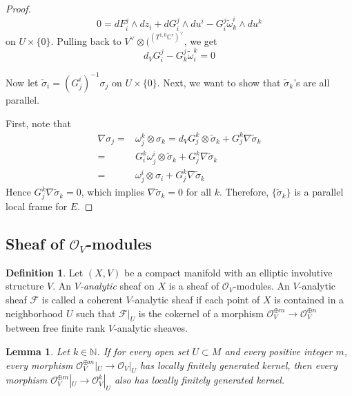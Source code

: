 \documentclass[12pt]{amsart}
\newtheorem{lem}[thm]{Lemma}
\theoremstyle{definition}
\newtheorem{defn}[thm]{Definition}
\theoremstyle{remark}
\numberwithin{equation}{section}
\newcommand{\CF}{{\mathcal F}}
\newcommand{\CO}{{\mathcal O}}
\newcommand{\C}{{\mathbb{C}}}
\newcommand{\N}{{\mathbb{N}}}
\newcommand{\1}{{\mathbb{1}}}
\begin{document}
\begin{proof}
 \begin{equation*}
     0 = dF^j_i\wedge dz_i + dG^j_i \wedge du^i - G^j_i \tilde{\omega}^i_k \wedge du^k
 \end{equation*}
 on $U \times \{0\}$. Pulling back to $V^{\vee}\otimes (^
 (T^{1,0}\C^r)^{\vee}$, we get   \begin{equation*}
     d_VG^j_i  - G^j_k \tilde{\omega}^k_i = 0
 \end{equation*}
 
 Now let $\tilde{\sigma}_i =(G^i_j)^{-1} \sigma_j$ on $U\times \{0\}$. Next, we want to show that $\tilde{\sigma}_k$'s are all parallel.
 
 First, note that
 \begin{align*}
     \nabla\sigma_j =& \omega^k_j \otimes \sigma_k = d_VG^k_j \otimes \tilde{\sigma}_k + G^k_j \nabla \tilde{\sigma}_k\\
     =&G^k_i\omega^i_j \otimes \tilde{\sigma}_k + G^k_j \nabla \tilde{\sigma}_k\\
     =&\omega^i_j \otimes {\sigma}_i + G^k_j \nabla \tilde{\sigma}_k
 \end{align*}
 Hence $ G^k_j \nabla \tilde{\sigma}_k = 0$, which implies $ \nabla \tilde{\sigma}_k = 0$ for all $k$. Therefore, $\{\tilde{\sigma}_k\}$ is a parallel local frame for $E$.
 \end{proof}
 
\subsection{Sheaf of $\CO_V$-modules}
\begin{defn}
    Let $(X, V)$ be a compact manifold with an elliptic involutive structure $V$. An {\it $V$-analytic} sheaf on $X$ is a sheaf of $\CO_V$-modules. An $V$-analytic sheaf $\CF$ is called a coherent $V$-analytic sheaf if each point of $X$ is contained in a neighborhood $U$ such that $\CF|_U$ is the cokernel of a morphism $\CO_V^{\oplus m} \to \CO_V^{\oplus n} $ between free finite rank $V$-analytic sheaves.
\end{defn}

\begin{lem}
    Let $k \in \N$. If for every open set $U\subset M$ and every positive integer $m$, every morphism $\CO_V^{\oplus m}|_U \to \CO_V^{}|_U$ has locally finitely generated kernel, then every morphism $\CO_V^{\oplus m}|_U \to \CO_V^{k}|_U$ also has locally finitely generated kernel.
\end{lem}
\end{document}
